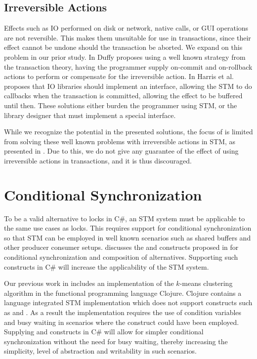 \subsection{Irreversible Actions}\label{subsec:irreversible}
Effects such as \ac{IO} performed on disk or network, native calls, or GUI operations are not reversible. This makes them unsuitable for use in transactions, since their effect cannot be undone should the transaction be aborted. We expand on this problem in our prior study\cite[p. 51-52]{dpt907e14trending}. In \cite{duffy2010stmnet} Duffy proposes using a well known strategy from the transaction theory\cite{reuter1993transaction}, having the programmer supply on-commit and on-rollback actions to perform or compensate for the irreversible action. In \cite{harris2005exceptions} Harris et al. proposes that \ac{IO} libraries should implement an interface, allowing the \ac{STM} to do callbacks when the transaction is committed, allowing the effect to be buffered until then. These solutions either burden the programmer using \ac{STM}, or the library designer that must implement a special interface.

While we recognize the potential in the presented solutions, the focus of \stmnamesp is limited from solving these well known problems with irreversible actions in \ac{STM}, as presented in . Due to this, we do not give any guarantee of the effect of using  irreversible actions in transactions, and it is thus discouraged.

\section{Conditional Synchronization}
\label{sec:req_conditional}
To be a valid alternative to locks in C\#, an \ac{STM} system must be applicable to the same use cases as locks. This requires support for conditional synchronization so that \ac{STM} can be employed in well known scenarios such as shared buffers and other producer consumer setups\cite[p. 128]{tanenbaum2008modern}.  discusses the  and  constructs proposed in \cite{harris2005composable} for conditional synchronization and composition of alternatives. Supporting such constructs in C\# will increase the applicability of the \ac{STM} system.

Our previous work in \cite{dpt907e14trending} includes an implementation of the $k$-means clustering algorithm\cite[p. 451]{dataminingconceptsandtechniques} in the functional programming language Clojure. Clojure contains a language integrated \ac{STM} implementation which does not support constructs such as  and . As a result the implementation requires the use of condition variables and busy waiting in scenarios where the  construct could have been employed\cite{duffy2010stmnet}. Supplying  and  constructs in C\# will allow for simpler conditional synchronization without the need for busy waiting, thereby increasing the simplicity, level of abstraction and writability in such scenarios. 

